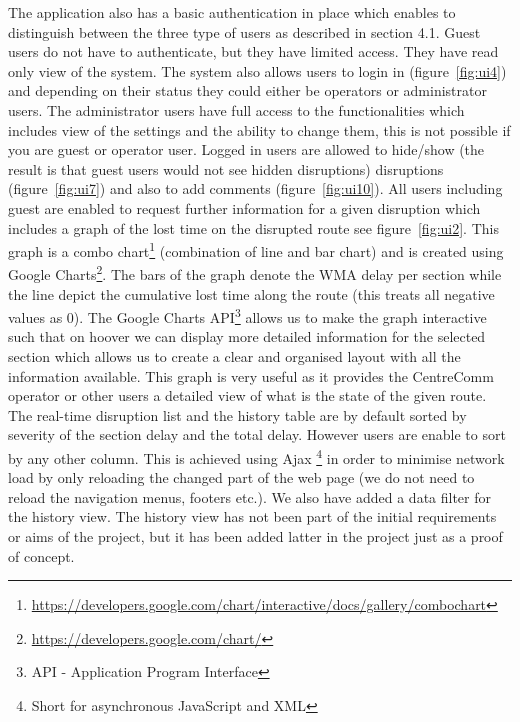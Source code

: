 The application also has a basic authentication in place which enables to distinguish between the three type of users as described in section 4.1. Guest users do not have to authenticate, but they have limited access. They have read only view of the system. The system also allows users to login in (figure~\ref{fig:ui4}) and depending on their status they could either be operators or administrator users. The administrator users have full access to the functionalities which includes view of the settings and the ability to change them, this is not possible if you are guest or operator user. Logged in users are allowed to hide/show (the result is that guest users would not see hidden disruptions) disruptions (figure~\ref{fig:ui7}) and also to add comments (figure~\ref{fig:ui10}). All users including guest are enabled to request further information for a given disruption which includes a graph of the lost time on the disrupted route see figure~\ref{fig:ui2}. This graph is a combo chart\footnote{\url{https://developers.google.com/chart/interactive/docs/gallery/combochart}} (combination of line and bar chart) and is created using Google Charts\footnote{\url{https://developers.google.com/chart/}}. The bars of the graph denote the WMA delay per section while the line depict the cumulative lost time along the route (this treats all negative values as $0$). The Google Charts API\footnote{API - Application Program Interface} allows us to make the graph interactive such that on hoover we can display more detailed information for the selected section which allows us to create a clear and organised layout with all the information available. This graph is very useful as it provides the CentreComm operator or other users a detailed view of what is the state of the given route. The real-time disruption list and the history table are by default sorted by severity of the section delay and the total delay. However users are enable to sort by any other column. This is achieved using Ajax \footnote{Short for asynchronous JavaScript and XML} in order to minimise network load by only reloading the changed part of the web page (we do not need to reload the navigation menus, footers etc.). We also have added a data filter for the history view. The history view has not been part of the initial requirements or aims of the project, but it has been added latter in the project just as a proof of concept.


